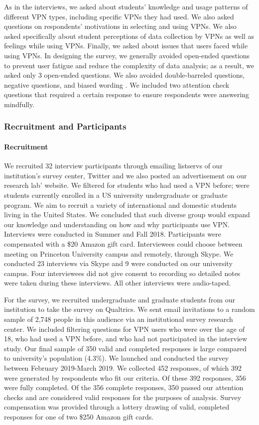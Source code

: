 As in the interviews, we asked about students’ knowledge and usage
patterns of different VPN types, including specific VPNs they had used. We
also asked questions on respondents’ motivations in selecting and using VPNs. We also asked specifically about student
perceptions of data collection by VPNs as well as feelings while using VPNs.
Finally, we asked about issues that users faced while using VPNs.  In designing the survey, we generally avoided
open-ended questions to prevent user fatigue and reduce the complexity of data
analysis; as a result, we asked only 3 open-ended questions. We also avoided
double-barreled questions, negative questions, and biased wording
\cite{lazar_28}. We included two attention check questions that required a
certain response to ensure respondents were answering mindfully. 

\subsubsection{Recruitment and Participants} 

\paragraph{Recruitment}
We recruited 32 interview participants through emailing listservs of our
institution's survey center, Twitter and we also posted an advertisement on
our research lab' website. We filtered for students who had used a VPN before;
were students currently enrolled in a US university undergraduate or graduate
program.  We aim to recruit a variety of international and domestic students
living in the United States.  We concluded that such diverse group would
expand our knowledge and understanding on how and why participants use VPN.
Interviews were conducted in Summer and Fall 2018. Participants were
compensated with a \$20 Amazon gift card.  Interviewees could choose between
meeting on Princeton University campus and remotely, through Skype. We
conducted 23 interviews via Skype and 9 were conducted on our university
campus.  Four interviewees did not give consent to recording so detailed notes
were taken during these interviews. All other interviews were audio-taped.

For the survey, we recruited undergraduate and graduate students from our
institution to take the survey on Qualtrics. We sent email invitations to a
random sample of 2,748 people in this audience via an institutional survey
research center. We included filtering questions for VPN users who were over
the age of 18, who had used a VPN before, and who had not participated in the
interview study. Our final sample of 350 valid and completed responses is
large compared to university's population (4.3\%). We launched and conducted
the survey between February 2019-March 2019. We collected 452 responses, of
which 392 were generated by respondents who fit our criteria. Of these 392
responses, 356 were fully completed. Of the 356 complete responses, 350 passed
our attention checks and are considered valid responses for the purposes of
analysis. Survey compensation was provided through a lottery drawing of valid,
completed responses for one of two \$250 Amazon gift cards.


